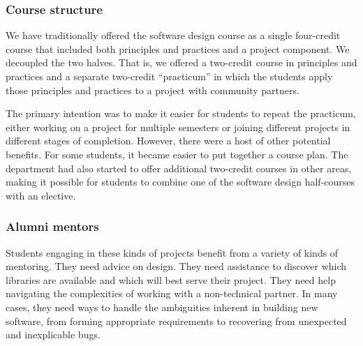 \subsubsection{Course structure}

We have traditionally offered the software design course as a single
four-credit course that included both principles and practices
and a project component.  We decoupled the two halves.  That is,
we offered a two-credit course in principles and practices and a
separate two-credit ``practicum'' in which the students apply those
principles and practices to a project with community partners.

The primary intention was to make it easier for students to repeat
the practicum, either working on a project for multiple semesters
or joining different projects in different stages of completion.
However, there were a host of other potential benefits.  For some
students, it became easier to put together a course plan. 
The department had also started to offer additional two-credit
courses in other areas, making it possible for students to combine
one of the software design half-courses with an elective.

\subsubsection{Alumni mentors}

Students engaging in these kinds of projects benefit from a variety
of kinds of mentoring.  They need advice on design.  They need
assistance to discover which libraries are available and which will
best serve their project.  They need help navigating the complexities
of working with a non-technical partner.  In many cases, they need
ways to handle the ambiguities inherent in building new software,
from forming appropriate requirements to recovering from unexpected
and inexplicable bugs.

